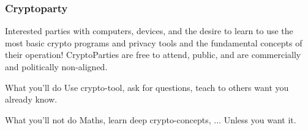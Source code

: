 \begin{frame}
    \frametitle{Cryptoparty}
    Interested parties with computers, devices, and the desire to learn to use
    the most basic crypto programs and privacy tools and the fundamental
    concepts of their operation! CryptoParties are free to attend, public, and
    are commercially and politically non-aligned.
    \begin{block}{What you'll do}
        Use crypto-tool, ask for questions, teach to others want you already
        know.
    \end{block}
    \begin{block}{What you'll not do}
        Maths, learn deep crypto-concepts, ...
        Unless you want it.
    \end{block}
\end{frame}
